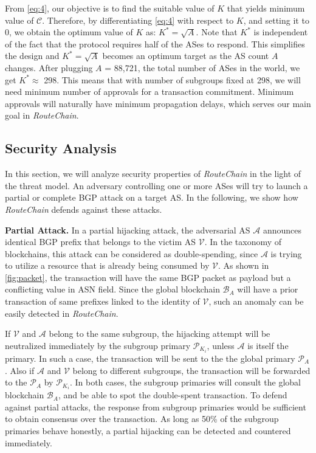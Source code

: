 \documentclass[5p]{elsarticle}
\newcommand{\BfPara}[1]{{\noindent\bf#1.}\xspace}
\newcommand{\rc}{{{\em RouteChain}}\xspace}
\begin{document}
From \autoref{eq:4}, our objective is to find the suitable value of $K$ that yields minimum value of $\mathcal{C}$. Therefore, by differentiating \autoref{eq:4} with respect to $K$, and setting it to $0$, we obtain the optimum value of $K$ as:  $K^* = \sqrt{A}$.  Note that $K^*$ is independent of the fact that the protocol requires half of the ASes to respond. This simplifies the design and $K^* = \sqrt{A}$ becomes an optimum target as the AS count $A$ changes. After plugging $A$ = 88,721, the total number of ASes in the world, we get $K^* \approx$ 298. This means that with number of subgroups fixed at 298, we will need minimum number of approvals for a transaction commitment. Minimum approvals will naturally have minimum propagation delays, which serves our main goal in \rc. 

\subsection{Security Analysis}\label{sec:SA}
In this section, we will analyze security properties of \rc in the light of the threat model. An adversary controlling one or more ASes will try to launch a partial or complete BGP attack on a target AS. In the following, we show how \rc defends against these attacks. 

\BfPara{Partial Attack} In a partial hijacking attack, the adversarial AS $\mathcal{A}$ announces identical BGP prefix that belongs to the victim AS $\mathcal{V}$. In the taxonomy of blockchains, this attack can be considered as double-spending, since $\mathcal{A}$ is trying to utilize a resource that is already being consumed by $\mathcal{V}$. As shown in \autoref{fig:packet}, the transaction will have the same BGP packet as payload but a conflicting value in ASN field. Since the global blockchain $\mathcal{B}_{A}$ will have a prior transaction of same prefixes linked to the identity of $\mathcal{V}$, such an anomaly can be easily detected in \rc. 

If $\mathcal{V}$ and $\mathcal{A}$ belong to the same subgroup, the hijacking attempt will be neutralized immediately by the subgroup primary $\mathcal{P}_{K_{i}}$, unless $\mathcal{A}$ is itself the primary. In such a case, the transaction will be sent to the the global primary $\mathcal{P}_{A}$. Also if $\mathcal{A}$ and $\mathcal{V}$ belong to different subgroups, the transaction will be forwarded to the $\mathcal{P}_{A}$ by $\mathcal{P}_{K_{i}}$. In both cases, the subgroup primaries will consult the global blockchain $\mathcal{B}_{A}$, and be able to spot the double-spent transaction. To defend against partial attacks, the response from subgroup primaries would be sufficient to obtain consensus over the transaction. As long as 50\% of the subgroup primaries behave honestly, a partial hijacking can be detected and countered immediately.  
\end{document}
